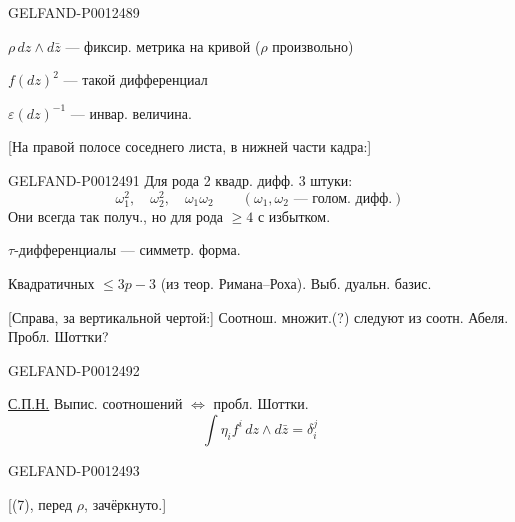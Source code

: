 \begin{GelfandAdjacentEvidence}{GELFAND-P001248}{9}


$\rho\,dz\wedge d\bar z$ — фиксир. метрика на кривой ($\rho$ произвольно)

$f(dz)^2$ — такой дифференциал

$\varepsilon(dz)^{-1}$ — инвар. величина.

[На правой полосе соседнего листа, в нижней части кадра:]
\end{GelfandAdjacentEvidence}



\begin{GelfandAdjacentEvidence}{GELFAND-P001249}{1}
Для рода 2 квадр. дифф. 3 штуки:
\begin{equation*}
\omega_1^2,\quad \omega_2^2,\quad \omega_1\omega_2
\qquad (\omega_1,\omega_2\text{ — голом. дифф.})
\end{equation*}
Они всегда так получ., но для рода $\geq4$ с избытком.

$\tau$-дифференциалы — симметр. форма.

Квадратичных $\leq 3p-3$ (из теор. Римана–Роха).
Выб. дуальн. базис.

[Справа, за вертикальной чертой:] Соотнош. множит.(?) следуют из соотн. Абеля. Пробл. Шоттки?
\end{GelfandAdjacentEvidence}
\begin{GelfandAdjacentEvidence}{GELFAND-P001249}{2}


\underline{С.П.Н.} Выпис. соотношений $\Leftrightarrow$ пробл. Шоттки.
\begin{equation*}
\int \eta_i f^i\,dz\wedge d\bar z=\delta_i^j\tag{6}
\end{equation*}
\end{GelfandAdjacentEvidence}
\begin{GelfandAdjacentEvidence}{GELFAND-P001249}{3}


[(7), перед $\rho$, зачёркнуто.]
\end{GelfandAdjacentEvidence}
